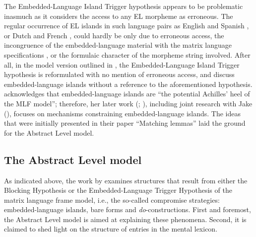 The Embedded-Language Island Trigger hypothesis appears to be problematic inasmuch as it considers the access to any EL morpheme as erroneous. The regular occurrence of EL islands in such language pairs as English and Spanish \citep[cf.][]{poplack-sometimes-1980}, or Dutch and French \citep[cf.][]{treffers-daller-mixing-1994}, could hardly be only due to erroneous access, the incongruence of the embedded-language material with the matrix language specifications \citep[250]{milroy-lexically-1995}, or the formulaic character of the morpheme string involved. After all, in the model version outlined in \citet[][249]{milroy-lexically-1995}, the Embedded-Language Island Trigger hypothesis is reformulated with no mention of erroneous access, and  \citet{myers-scotton-matching-1995} discuss embedded-language islands without a reference to the aforementioned hypothesis. \citet[137]{myers-scotton-duelling-1993} acknowledges that embedded-language islands are ``the potential Achilles' heel of the MLF model''; therefore, her later work (\citeyear{myers-scotton-matrix-2001}; \citeyear{myers-scotton-contact-2002}), including joint research with Jake (\citeyear{myers-scotton-matching-1995}), focuses on mechanisms constraining embedded-language islands. The ideas that were initially presented in their \citeyear{myers-scotton-matching-1995} paper ``Matching lemmas'' laid the ground for the Abstract Level model.

\subsection{The Abstract Level model}
As indicated above, the work by \citet{myers-scotton-matching-1995} examines structures that result from either the Blocking Hypothesis or the Embedded-Language Trigger Hypothesis of the matrix language frame model, i.e., the so-called compromise strategies: embedded-language islands, bare forms and \textit{do}-constructions. First and foremost, the Abstract Level model is aimed at explaining these phenomena. Second, it is claimed to shed light on the structure of entries in the mental lexicon.

